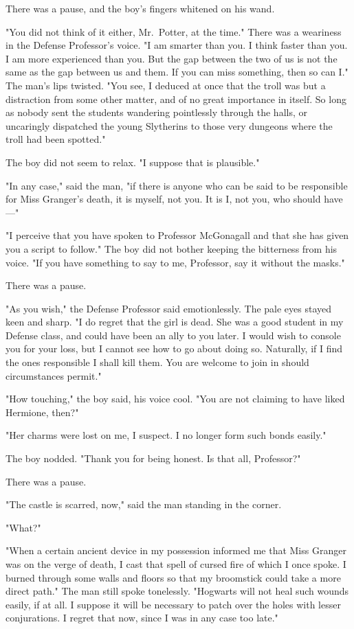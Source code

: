 There was a pause, and the boy's fingers whitened on his wand.

"You did not think of it either, Mr.~Potter, at the time." There was a 
weariness in the Defense Professor's voice. "I am smarter than you. I think 
faster than you. I am more experienced than you. But the gap between the two of 
us is not the same as the gap between us and them. If you can miss something, 
then so can I." The man's lips twisted. "You see, I deduced at once that the 
troll was but a distraction from some other matter, and of no great importance 
in itself. So long as nobody sent the students wandering pointlessly through 
the halls, or uncaringly dispatched the young Slytherins to those very dungeons 
where the troll had been spotted."

The boy did not seem to relax. "I suppose that is plausible."

"In any case," said the man, "if there is anyone who can be said to be 
responsible for Miss Granger's death, it is myself, not you. It is I, not you, 
who should have---"

"I perceive that you have spoken to Professor McGonagall and that she has given 
you a script to follow." The boy did not bother keeping the bitterness from his 
voice. "If you have something to say to me, Professor, say it without the 
masks."

There was a pause.

"As you wish," the Defense Professor said emotionlessly. The pale eyes stayed 
keen and sharp. "I do regret that the girl is dead. She was a good student in 
my Defense class, and could have been an ally to you later. I would wish to 
console you for your loss, but I cannot see how to go about doing so. 
Naturally, if I find the ones responsible I shall kill them. You are welcome to 
join in should circumstances permit."

"How touching," the boy said, his voice cool. "You are not claiming to have 
liked Hermione, then?"

"Her charms were lost on me, I suspect. I no longer form such bonds easily."

The boy nodded. "Thank you for being honest. Is that all, Professor?"

There was a pause.

"The castle is scarred, now," said the man standing in the corner.

"What?"

"When a certain ancient device in my possession informed me that Miss Granger 
was on the verge of death, I cast that spell of cursed fire of which I once 
spoke. I burned through some walls and floors so that my broomstick could take 
a more direct path." The man still spoke tonelessly. "Hogwarts will not heal 
such wounds easily, if at all. I suppose it will be necessary to patch over the 
holes with lesser conjurations. I regret that now, since I was in any case too 
late."

